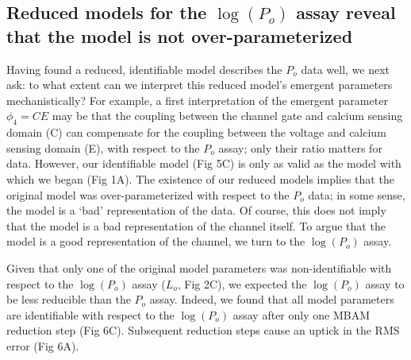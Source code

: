 \documentclass[10pt]{amsart}
\newcommand\Po{P_o}
\newcommand\po{P_o}
\newcommand\lpo{\log(\Po)}
\newcommand{\lo}{L_o}
\begin{document}
\subsection{Reduced models for the $\lpo$ assay reveal that the model is not over-parameterized}

Having found a reduced, identifiable model describes the $\po$ data well, we next ask: to what extent can we interpret this reduced model's emergent parameters mechanistically?  For example, a first interpretation of the emergent parameter $\phi_4=CE$ may be that the coupling between the channel gate and calcium sensing domain (C) can compensate for the coupling between the voltage and calcium sensing domain (E), with respect to the $\po$ assay; only their ratio matters for data.  However, our identifiable model (Fig 5C) is only as valid as the model with which we began (Fig 1A).  The existence of our reduced models implies that the original model was over-parameterized with respect to the $\po$ data; in some sense, the model is a `bad' representation of the data.  Of course, this does not imply that the model is a bad representation of the channel itself.  To argue that the model is a good representation of the channel, we turn to the $\lpo$ assay.

Given that only one of the original model parameters was non-identifiable with respect to the $\lpo$ assay ($\lo$, Fig 2C), we expected the $\lpo$ assay to be   less reducible than the $\po$ assay.  Indeed, we found that all model parameters are identifiable with respect to the $\lpo$ assay after only one MBAM reduction step (Fig 6C).  Subsequent reduction steps cause an uptick in the RMS error (Fig 6A).






\end{document}
